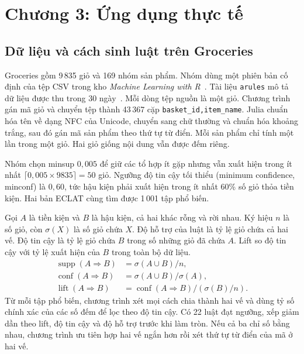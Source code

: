 \section{Chương 3: Ứng dụng thực tế}
\label{sec:applications}

\begin{table}[!t]
\centering\small
\caption{Mười luật kết hợp đứng đầu theo lift trên Groceries. Số giỏ tính cho cả hai vế. Bảng hiển thị các chỉ số đã làm tròn.}
\label{tab:groceries-top10-m2}
\TableGroceries
\end{table}

\subsection{Dữ liệu và cách sinh luật trên Groceries}
Groceries gồm 9\,835 giỏ và 169 nhóm sản phẩm. Nhóm dùng một phiên
bản cố định của tệp CSV trong kho \emph{Machine Learning with
R}~\cite{groceries_source_b}. Tài liệu \texttt{arules} mô tả dữ liệu
được thu trong 30 ngày~\cite{groceries_documentation_b}. Mỗi dòng
tệp nguồn là một giỏ. Chương trình gán mã giỏ và chuyển tệp thành
43\,367 cặp \texttt{basket\_id,item\_name}. Julia chuẩn hóa tên về
dạng NFC của Unicode, chuyển sang chữ thường và chuẩn hóa khoảng
trắng, sau đó gán mã sản phẩm theo thứ tự từ điển. Mỗi sản phẩm chỉ
tính một lần trong một giỏ. Hai giỏ giống nội dung vẫn được đếm riêng.

Nhóm chọn minsup $0{,}005$ để giữ các tổ hợp ít gặp nhưng vẫn xuất
hiện trong ít nhất $\lceil0{,}005\times9835\rceil=50$ giỏ. Ngưỡng
độ tin cậy tối thiểu (minimum confidence, minconf) là $0{,}60$,
tức hậu kiện phải xuất hiện trong ít nhất 60\% số giỏ thỏa tiền
kiện. Hai bản ECLAT cùng tìm được 1\,001 tập phổ biến.

Gọi $A$ là tiền kiện và $B$ là hậu kiện, cả hai khác rỗng và rời
nhau. Ký hiệu $n$ là số giỏ, còn $\sigma(X)$ là số giỏ chứa $X$.
Độ hỗ trợ của luật là tỷ lệ giỏ chứa cả hai vế. Độ tin cậy là tỷ lệ
giỏ chứa $B$ trong số những giỏ đã chứa $A$. Lift so độ tin cậy
với tỷ lệ xuất hiện của $B$ trong toàn bộ dữ liệu.
\begin{align}
\operatorname{supp}(A\Rightarrow B)&=\sigma(A\cup B)/n,\\
\operatorname{conf}(A\Rightarrow B)&=\sigma(A\cup B)/\sigma(A),\\
\operatorname{lift}(A\Rightarrow B)&=\operatorname{conf}(A\Rightarrow B)/(\sigma(B)/n).
\end{align}
Từ mỗi tập phổ biến, chương trình xét mọi cách chia thành hai vế
và dùng tỷ số chính xác của các số đếm để lọc theo độ tin cậy.
Có 22 luật đạt ngưỡng, xếp giảm dần theo lift, độ tin cậy và độ
hỗ trợ trước khi làm tròn. Nếu cả ba chỉ số bằng nhau, chương
trình ưu tiên hợp hai vế ngắn hơn rồi xét thứ tự từ điển của
mã ở hai vế.

